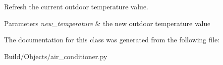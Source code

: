 Refresh the current outdoor temperature value. 


\begin{DoxyParams}{Parameters}
{\em new\+\_\+temperature} & the new outdoor temperature value \\
\hline
\end{DoxyParams}


The documentation for this class was generated from the following file\+:\begin{DoxyCompactItemize}
\item 
Build/\+Objects/air\+\_\+conditioner.\+py\end{DoxyCompactItemize}
